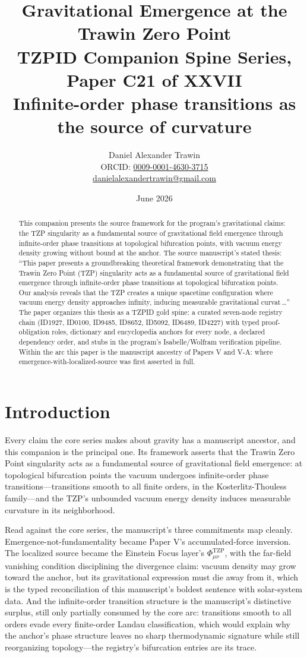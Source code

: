 \documentclass[11pt]{article}
\title{Gravitational Emergence at the Trawin Zero Point\\[0.6em]
\large TZPID Companion Spine Series, Paper C21 of XXVII\\
\normalsize Infinite-order phase transitions as the source of curvature}
\author{Daniel Alexander Trawin\\
\small ORCID: \href{https://orcid.org/0009-0001-4630-3715}{0009-0001-4630-3715}\\
\small \href{mailto:danielalexandertrawin@gmail.com}{danielalexandertrawin@gmail.com}}
\date{June 2026}
\theoremstyle{remark}
\begin{document}
\maketitle

\begin{abstract}
This companion presents the source framework for the program's gravitational claims: the TZP singularity as a fundamental source of gravitational field emergence through infinite-order phase transitions at topological bifurcation points, with vacuum energy density growing without bound at the anchor.
The source manuscript's stated thesis: ``This paper presents a groundbreaking theoretical framework demonstrating that the Trawin Zero Point (TZP) singularity acts as a fundamental source of gravitational field emergence through infinite-order phase transitions at topological bifurcation points. Our analysis reveals that the TZP creates a unique spacetime configuration where vacuum energy density approaches infinity, inducing measurable gravitational curvat\,\ldots'' The paper organizes this thesis as a TZPID gold spine: a curated seven-node registry chain (ID1927, ID0100, ID9485, ID8652, ID5092, ID6489, ID4227) with typed proof-obligation roles, dictionary and encyclopedia anchors for every node, a declared dependency order, and stubs in the program's Isabelle/Wolfram verification pipeline. Within the arc this paper is the manuscript ancestry of Papers V and V-A: where emergence-with-localized-source was first asserted in full.
\end{abstract}

\section{Introduction}
\label{sec:intro}

Every claim the core series makes about gravity has a manuscript ancestor, and this companion is the principal one. Its framework asserts that the Trawin Zero Point singularity acts as a fundamental source of gravitational field emergence: at topological bifurcation points the vacuum undergoes infinite-order phase transitions---transitions smooth to all finite orders, in the Kosterlitz-Thouless family---and the TZP's unbounded vacuum energy density induces measurable curvature in its neighborhood.

Read against the core series, the manuscript's three commitments map cleanly. Emergence-not-fundamentality became Paper V's accumulated-force inversion. The localized source became the Einstein Focus layer's $\Phi^{\mathrm{TZP}}_{\mu\nu}$, with the far-field vanishing condition disciplining the divergence claim: vacuum density may grow toward the anchor, but its gravitational expression must die away from it, which is the typed reconciliation of this manuscript's boldest sentence with solar-system data. And the infinite-order transition structure is the manuscript's distinctive surplus, still only partially consumed by the core arc: transitions smooth to all orders evade every finite-order Landau classification, which would explain why the anchor's phase structure leaves no sharp thermodynamic signature while still reorganizing topology---the registry's bifurcation entries are its trace.
\end{document}
